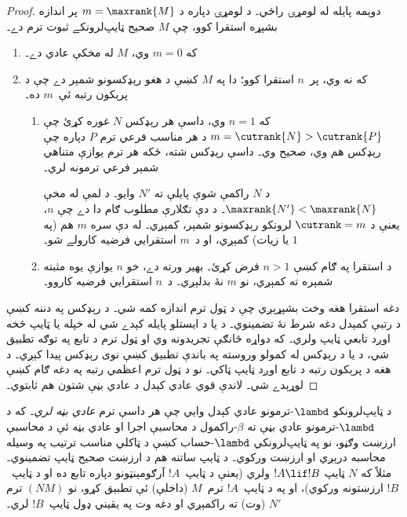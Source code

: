 \documentclass[../../../include/open-logic-section]{subfiles}
\begin{document}
\begin{proof}
  دويمه پايله له لومړۍ راځي۔ د لومړۍ دپاره د
  $m=\maxrank{M}$ پر اندازه بشپړه استقرا کوو، چې $M$
  صحيح ټايپ‌لرونکے ثبوت ترم دے۔
  \begin{enumerate}

  \item که $m=0$ وي، $M$ له مخکې عادي دے۔
  \item
    که نه وي، پر~$n$ استقرا کوو؛ دا په $M$ کښې د هغو
    رېډکسونو شمېر دے چې د پرېکون رتبه ئې~$m$ ده۔
    \begin{enumerate}
    \item که $n=1$ وي، داسې هر رېډکس $N$ غوره کړئ چې
      $m = \cutrank{N} > \cutrank{P}$ د هر مناسب فرعي ترم
      $P$ دپاره چې رېډکس هم وي، صحيح وي۔ داسې رېډکس شته،
      ځکه هر ترم يوازې متناهي شمېر فرعي ترمونه لري۔

      د $N$ راکمې شوې پايلې ته $N'$ وايو۔ د لمې له مخې
      $\maxrank{N'} < \maxrank{N}$۔ د دې تګلارې مطلوب ګام دا دے چې
      $n$، يعنې د $\cutrank=m$ لرونکو رېډکسونو شمېر، کمېږي۔
      له دې سره $m$ هم (په $1$ يا زيات) کمېږي، او د~$m$
      استقرايي فرضيه کارولے شو۔
    \item د استقرا په ګام کښې $n>1$ فرض کړئ۔ بهير ورته
      دے، خو $n$ يوازې يوه مثبته شمېره ته کمېږي، نو $m$
      نۀ بدلېږي۔ د~$n$ استقرايي فرضيه کاروو۔
    \end{enumerate}
\end{enumerate}
دغه استقرا هغه وخت بشپړېږي چې د ټول ترم اندازه کمه شي۔
د رېډکس په دننه کښې د رتبې کمېدل دغه شرط نۀ تضمينوي۔
د يا د ايستلو پايله کېدے شي له خپله يا ټايپ څخه اوږد
تابعي ټايپ ولري۔ که دواړه څانګې تجريدونه وي او ټول ترم
د تابع په توګه تطبيق شي، د يا د رېډکس له کمولو وروسته
په باندې تطبيق کښې نوی رېډکس پيدا کېږي۔ د هغه د پرېکون
رتبه د تابع اوږد ټايپ ټاکي۔ نو د ټول ترم اعظمي رتبه
په دغه ګام کښې لوړېدے شي۔ لاندې قوي عادي کېدل د عادي
بڼې شتون هم ثابتوي۔
\end{proof}

د ټايپ‌لرونکو $\lambd$-ترمونو عادي کېدل وايي چې هر داسې
ترم \emph{عادي بڼه لري}۔ که د $\lambd$-ترمونو عادي بڼې
ته $\beta$-راکمول د محاسبې اجرا او عادي بڼه ئې د محاسبې
ارزښت وګڼو، نو په ټايپ‌لرونکي $\lambd$-حساب کښې د ټاکلي مناسب ترتيب په وسيله محاسبه درېږي
او ارزښت ورکوي۔ د ټايپ ساتنه هم د ارزښت صحيح ټايپ
تضمينوي۔ مثلاً که $N$ ټايپ $!A \lif !B$ ولري (يعنې د
ټايپ~$!A$ آرګومېنټونو دپاره تابع ده او د ټايپ~$!B$
ارزښتونه ورکوي)، او په د ټايپ~$!A$ ترم~$M$ (داخلې)
ئې تطبيق کړو، نو $(NM)$ ترم $N'$ (وت) ته راکمېږي او
دغه وت په يقيني ډول ټايپ~$!B$ لري۔
\end{document}
